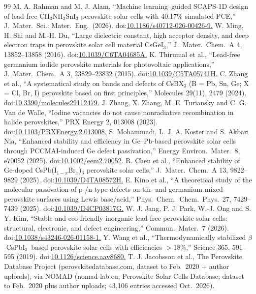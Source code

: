 \documentclass[aip,amsmath,amssymb,preprint]{revtex4-2}
\begin{document}
\begin{thebibliography}{99}
 M. A. Rahman and M. J. Alam, ``Machine learning--guided SCAPS-1D design of lead-free CH$_{3}$NH$_{3}$SnI$_{3}$ perovskite solar cells with 40.17\% simulated PCE,'' J.\ Mater.\ Sci.: Mater.\ Eng.\ (2026). doi:\url{10.1186/s40712-026-00426-9.}
 W. Ming, H. Shi and M.-H. Du, ``Large dielectric constant, high acceptor density, and deep electron traps in perovskite solar cell material CsGeI$_{3}$,'' J.\ Mater.\ Chem.\ A 4, 13852--13858 (2016). doi:\url{10.1039/C6TA04685A.}
 K. Thirumal et al., ``Lead-free germanium iodide perovskite materials for photovoltaic applications,'' J.\ Mater.\ Chem.\ A 3, 23829--23832 (2015). doi:\url{10.1039/C5TA05741H.}
 C. Zhang et al., ``A systematical study on bands and defects of CsBX$_{3}$ (B = Pb, Sn, Ge; X = Cl, Br, I) perovskite based on first principles,'' Molecules 29(11), 2479 (2024). doi:\url{10.3390/molecules29112479.}
 J. Zhang, X. Zhang, M. E. Turiansky and C. G. Van de Walle, ``Iodine vacancies do not cause nonradiative recombination in halide perovskites,'' PRX Energy 2, 013008 (2023). doi:\url{10.1103/PRXEnergy.2.013008.}
 S. Mohammadi, L. J. A. Koster and S. Akbari Nia, ``Enhanced stability and efficiency in Ge--Pb-based perovskite solar cells through PCCMAI-induced Ge defect passivation,'' Energy Environ.\ Mater.\ 8, e70052 (2025). doi:\url{10.1002/eem2.70052.}
 R. Chen et al., ``Enhanced stability of Ge-doped CsPb(I$_{1-x}$Br$_{x}$)$_{3}$ perovskite solar cells,'' J.\ Mater.\ Chem.\ A 13, 9822--9829 (2025). doi:\url{10.1039/D4TA08572H.}
 E. Kino et al., ``A theoretical study of the molecular passivation of p-/n-type defects on tin- and germanium-mixed perovskite surfaces using Lewis base/acid,'' Phys.\ Chem.\ Chem.\ Phys.\ 27, 7429--7439 (2025). doi:\url{10.1039/D4CP03817G.}
 W. J. Jang, P. J. Park, W.-J. Ong and S. Y. Kim, ``Stable and eco-friendly inorganic lead-free perovskite solar cells: structural, electronic, and defect engineering,'' Commun.\ Mater.\ 7 (2026). doi:\url{10.1038/s43246-026-01158-1.}
 Y. Wang et al., ``Thermodynamically stabilized $\beta$-CsPbI$_{3}$--based perovskite solar cells with efficiencies $>$18\%,'' Science 365, 591--595 (2019). doi:\url{10.1126/science.aav8680.}
 T. J. Jacobsson et al., The Perovskite Database Project (perovskitedatabase.com, dataset to Feb.\ 2020 + author uploads), via NOMAD (nomad-lab.eu, Perovskite Solar Cells Database; dataset to Feb.\ 2020 plus author uploads; 43,106 entries accessed Oct.\ 2026).
\end{thebibliography}
\end{document}

